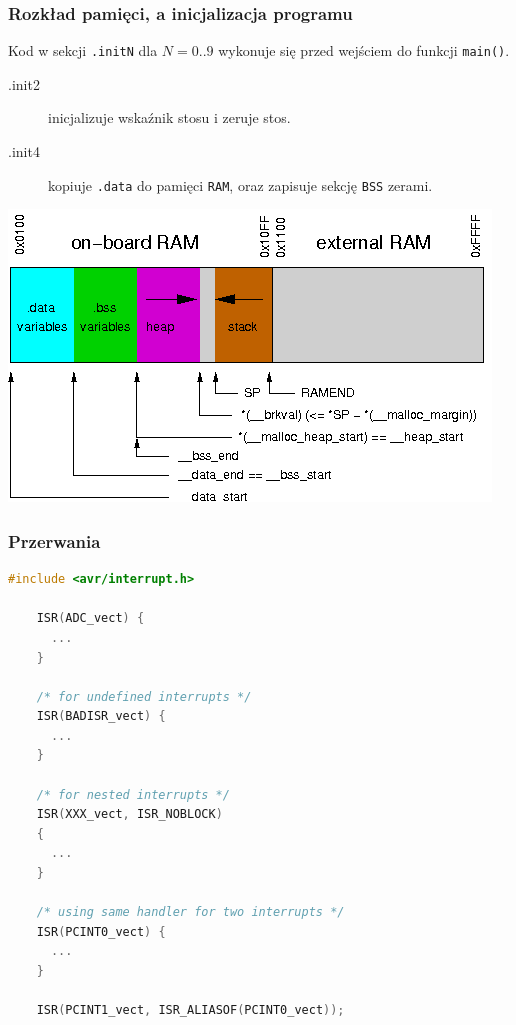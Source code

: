 \documentclass[8pt]{beamer}
\begin{document}
\begin{frame}[fragile]
  \frametitle{Rozkład pamięci, a inicjalizacja programu}

  \begin{alertblock}{}
    Kod w sekcji \texttt{.initN} dla $N = {0..9}$ wykonuje się przed wejściem do funkcji
    \texttt{main()}.
    \begin{description}
      \item[.init2] inicjalizuje wskaźnik stosu i zeruje stos.
      \item[.init4] kopiuje \texttt{.data} do pamięci \texttt{RAM}, oraz
        zapisuje sekcję \texttt{BSS} zerami. 
    \end{description}
  \end{alertblock}

  \begin{center}
    \includegraphics[scale=0.5]{images/malloc-std.png}
  \end{center}
\end{frame}

\begin{frame}[fragile]
  \frametitle{Przerwania}

  \begin{lstlisting}[language=c]
    #include <avr/interrupt.h>

    ISR(ADC_vect) {
      ...
    }

    /* for undefined interrupts */
    ISR(BADISR_vect) {
      ...
    }

    /* for nested interrupts */
    ISR(XXX_vect, ISR_NOBLOCK)
    {
      ...
    }

    /* using same handler for two interrupts */
    ISR(PCINT0_vect) {
      ...
    }

    ISR(PCINT1_vect, ISR_ALIASOF(PCINT0_vect));
  \end{lstlisting}
\end{frame}
\end{document}
